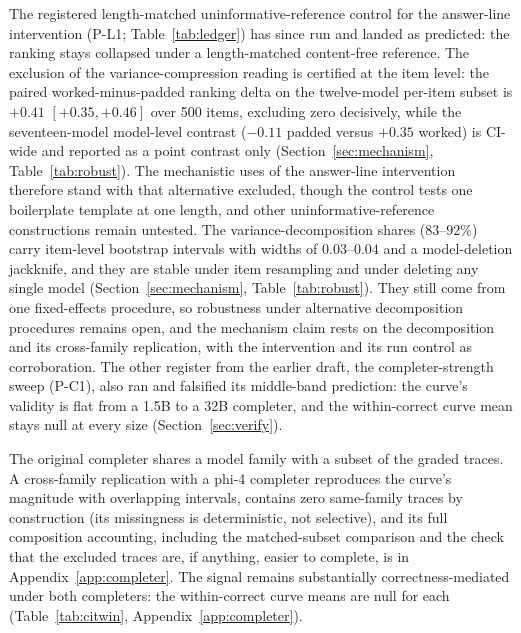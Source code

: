 The registered length-matched uninformative-reference control for the answer-line intervention (P-L1; Table~\ref{tab:ledger}) has since run and landed as predicted: the ranking stays collapsed under a length-matched content-free reference.
The exclusion of the variance-compression reading is certified at the item level: the paired worked-minus-padded ranking delta on the twelve-model per-item subset is $+0.41$ $[+0.35, +0.46]$ over 500 items, excluding zero decisively, while the seventeen-model model-level contrast ($-0.11$ padded versus $+0.35$ worked) is CI-wide and reported as a point contrast only (Section~\ref{sec:mechanism}, Table~\ref{tab:robust}).
The mechanistic uses of the answer-line intervention therefore stand with that alternative excluded, though the control tests one boilerplate template at one length, and other uninformative-reference constructions remain untested.
The variance-decomposition shares ($83$--$92\%$) carry item-level bootstrap intervals with widths of $0.03$--$0.04$ and a model-deletion jackknife, and they are stable under item resampling and under deleting any single model (Section~\ref{sec:mechanism}, Table~\ref{tab:robust}).
They still come from one fixed-effects procedure, so robustness under alternative decomposition procedures remains open, and the mechanism claim rests on the decomposition and its cross-family replication, with the intervention and its run control as corroboration.
The other register from the earlier draft, the completer-strength sweep (P-C1), also ran and falsified its middle-band prediction: the curve's validity is flat from a 1.5B to a 32B completer, and the within-correct curve mean stays null at every size (Section~\ref{sec:verify}).

The original completer shares a model family with a subset of the graded traces.
A cross-family replication with a phi-4 completer reproduces the curve's magnitude with overlapping intervals, contains zero same-family traces by construction (its missingness is deterministic, not selective), and its full composition accounting, including the matched-subset comparison and the check that the excluded traces are, if anything, easier to complete, is in Appendix~\ref{app:completer}.
The signal remains substantially correctness-mediated under both completers: the within-correct curve means are null for each (Table~\ref{tab:citwin}, Appendix~\ref{app:completer}).


